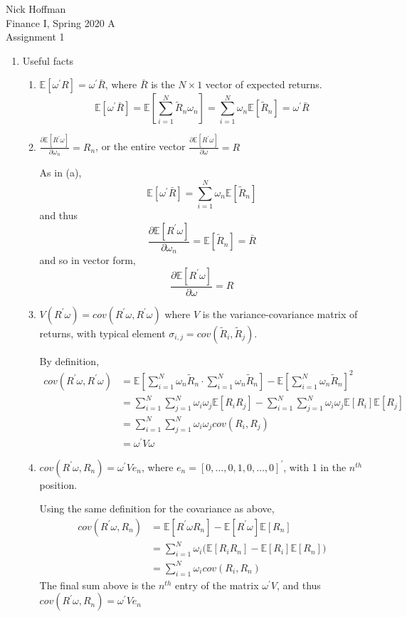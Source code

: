\documentclass[11pt]{article}
\newcommand{\w}{\omega}
\newcommand{\p}{\prime}
\newcommand{\ev}{\mathbb{E}}
\begin{document}
\begin{flushleft}
	Nick Hoffman \\
	Finance I, Spring 2020 A \\
	Assignment 1 \\
\end{flushleft}

\begin{enumerate}
	\item Useful facts
	\begin{enumerate}
		\item $ \ev[\w ^\p R ] = \w^\p \bar{R} $, where $\bar{R}$ is the $ N\times 1 $ vector of expected returns.
		\[\ev[\w^\p \bar{R}] = \ev\left[\sum_{i = 1}^{N}\tilde{R}_n \w_n\right] = \sum_{i = 1}^N \w_n \ev[\tilde{R}_n] = \w^\p \bar{R} \]
		
		\item $ \frac{\partial \ev[R^\p \w]}{\partial \w_n} = R_n $, or the entire vector $  \frac{\partial \ev[R^\p \w]}{\partial \w} = R $
		
		As in (a),
		\[\ev[\w^\p \bar{R}] =\sum_{i = 1}^N \w_n \ev[\tilde{R}_n]\]
		and thus
		\[\frac{\partial \ev[R^\p \w]}{\partial \w_n} = \ev[\tilde{R}_n] = \bar{R}\]
		and so in vector form,
		\[ \frac{\partial \ev[R^\p \w]}{\partial \w} = R\]
		
		\item $ V(R^\p \w) = cov(R^\p \w, R^\p \w) $ where $ V $ is the variance-covariance matrix of returns, with typical element $ \sigma_{i,j} = cov(\tilde{R}_i, \tilde{R}_j) $.
		
		By definition, 
		\begin{align*}
		cov(R^\p \w, R^\p \w) &= \ev\left[\sum_{i = 1}^N \w_n \tilde{R}_n \cdot \sum_{i = 1}^N \w_n \tilde{R}_n\right] - \ev\left[\sum_{i = 1}^N \w_n \tilde{R}_n\right]^2 \\
		&= \sum_{i = 1}^N \sum_{j = 1}^N \w_i \w_j \ev[R_i R_j] - \sum_{i = 1}^N \sum_{j = 1}^N \w_i \w_j \ev[R_i] \ev[R_j] \\
		&= \sum_{i = 1}^N \sum_{j = 1}^N \w_i\w_j cov(R_i, R_j) \\
		&= \w^\p V\w
		\end{align*}
		
		\item $ cov(R^\p \w, R_n) = \w^\p V e_n $, where $ e_n = [0, \dots, 0, 1, 0, \dots, 0]^\p $, with 1 in the $ n^{th} $ position.
		
		Using the same definition for the covariance as above, 
		\begin{align*}
		cov(R^\p \w, R_n) &= \ev[R^\p \w R_n] - \ev[R^\p \w]\ev[R_n] \\
		&= \sum_{i = 1}^N \w_i \big(\ev[R_i R_n] - \ev[R_i]\ev[R_n]\big) \\
		&= \sum_{i = 1}^N \w_i cov(R_i, R_n)
		\end{align*} 
		The final sum above is the $ n^{th} $ entry of the matrix $ \w^\p V $, and thus $ cov(R^\p \w, R_n) = \w^\p V e_n $
		

\end{enumerate}
\end{enumerate}
\end{document}
